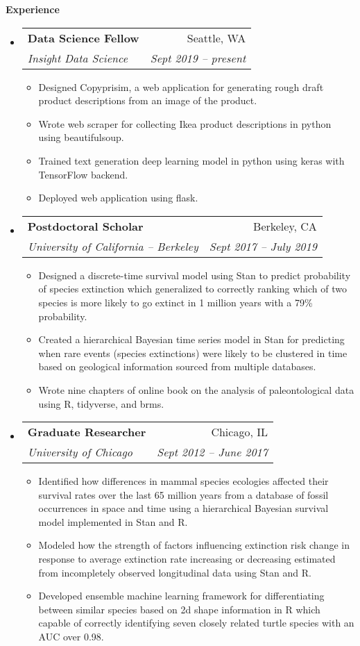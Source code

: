 \documentclass[letterpaper,11pt]{article}
\makeatletter
\newcommand{\resitem}[1]{\item #1 \vspace{-2pt}}
\newcommand{\resheading}[1]{
  {\large \colorbox{mygrey}{\begin{minipage}{\textwidth}{\textbf{#1 \vphantom{p\^{E}}}}\end{minipage}}}
}
\newcommand{\ressubheading}[4]{
  \begin{tabular*}{6.5in}{l@{\extracolsep{\fill}}r}
    \textbf{#1} & #2 \\
    \textit{#3} & \textit{#4} \\
\end{tabular*}\vspace{-6pt}}
\makeatother
\begin{document}
\resheading{Experience}
\begin{itemize}
  \item 
    \ressubheading{Data Science Fellow}{Seattle, WA}{Insight Data Science}{Sept 2019 -- present}
    { \footnotesize
      \begin{itemize}
          \resitem{Designed Copyprisim, a web application for generating rough draft product descriptions from an image of the product.}
          \resitem{Wrote web scraper for collecting Ikea product descriptions in python using beautifulsoup.}
          \resitem{Trained text generation deep learning model in python using keras with TensorFlow backend.}
          \resitem{Deployed web application using flask.}
      \end{itemize}
    }
  \item 
    \ressubheading{Postdoctoral Scholar}{Berkeley, CA}{University of California -- Berkeley}{Sept 2017 -- July 2019}
    { \footnotesize
      \begin{itemize}
          \resitem{Designed a discrete-time survival model using Stan to predict probability of species extinction which generalized to correctly ranking which of two species is more likely to go extinct in 1 million years with a 79\% probability.}
          \resitem{Created a hierarchical Bayesian time series model in Stan for predicting when rare events (species extinctions) were likely to be clustered in time based on geological information sourced from multiple databases.}
          \resitem{Wrote nine chapters of online book on the analysis of paleontological data using R, tidyverse, and brms.}
      \end{itemize}
    }
  \item 
    \ressubheading{Graduate Researcher}{Chicago, IL}{University of Chicago}{Sept 2012 -- June 2017}
    { \footnotesize
      \begin{itemize}
          \resitem{Identified how differences in mammal species ecologies affected their survival rates over the last 65 million years from a database of fossil occurrences in space and time using a hierarchical Bayesian survival model implemented in Stan and R.}
          \resitem{Modeled how the strength of factors influencing extinction risk change in response to average extinction rate increasing or decreasing estimated from incompletely observed longitudinal data using Stan and R.}
          \resitem{Developed ensemble machine learning framework for differentiating between similar species based on 2d shape information in R which capable of correctly identifying seven closely related turtle species with an AUC over 0.98.}

\end{itemize}}
\end{itemize}
\end{document}
